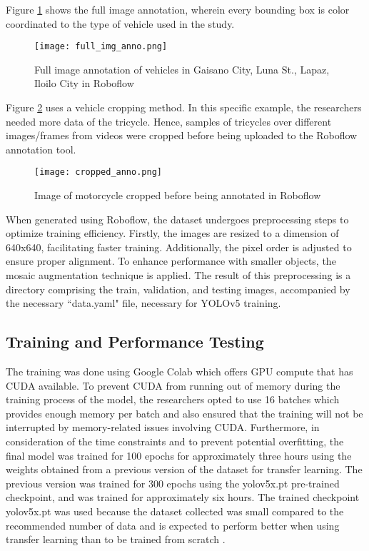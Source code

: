 Figure \ref{fig:full_img_anno} shows the full image annotation, wherein every bounding box is color coordinated to the type of vehicle used in the study.

\begin{figure}[!htbp]
	\texttt{[image: full\_img\_anno.png]}
	\caption{Full image annotation of vehicles in Gaisano City, Luna St., Lapaz, Iloilo City in Roboflow}
	\label{fig:full_img_anno}
\end{figure}
\FloatBarrier

Figure \ref{fig:cropped_anno} uses a vehicle cropping method. In this specific example, the researchers needed more data of the tricycle. Hence, samples of tricycles over different images/frames from videos were cropped before being uploaded to the Roboflow annotation tool. 

\begin{figure}[!htbp]
	\texttt{[image: cropped\_anno.png]}
	\caption{Image of motorcycle cropped before being annotated in Roboflow}
	\label{fig:cropped_anno}
\end{figure}
\FloatBarrier

When generated using Roboflow, the dataset undergoes preprocessing steps to optimize training efficiency. Firstly, the images are resized to a dimension of 640x640, facilitating faster training. Additionally, the pixel order is adjusted to ensure proper alignment. To enhance performance with smaller objects, the mosaic augmentation technique is applied. The result of this preprocessing is a directory comprising the train, validation, and testing images, accompanied by the necessary ``data.yaml" file, necessary for YOLOv5 training.


\newpage

\subsection{Training and Performance Testing}
The training was done using Google Colab which offers GPU compute that has CUDA available. To prevent CUDA from running out of memory during the training process of the model, the researchers opted to use 16 batches which provides enough memory per batch and also ensured that the training will not be interrupted by memory-related issues involving CUDA. Furthermore, in consideration of the time constraints and to prevent potential overfitting, the final model was trained for 100 epochs for approximately three hours using the weights obtained from a previous version of the dataset for transfer learning. The previous version was trained for 300 epochs using the yolov5x.pt pre-trained checkpoint, and was trained for approximately six hours. The trained checkpoint yolov5x.pt was used because the dataset collected was small compared to the recommended number of data \cite{Jocher_Waxmann_2022} and is expected to perform better when using transfer learning than to be trained from scratch \cite{Lihi_Gur_Arie_2023}.

